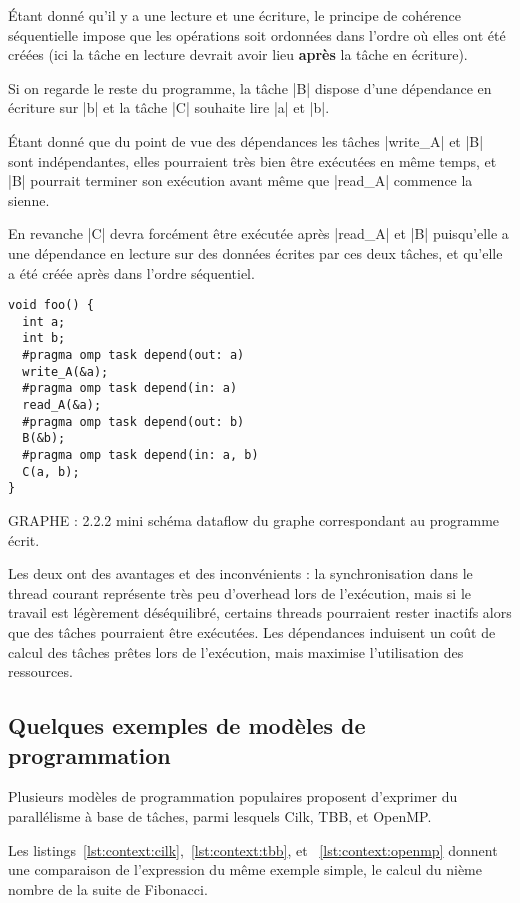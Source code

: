 Étant donné qu'il y a une lecture et une écriture, le principe de cohérence séquentielle impose que les opérations soit ordonnées dans l'ordre où elles ont été créées (ici la tâche en lecture devrait avoir lieu \textbf{après} la tâche en écriture).

Si on regarde le reste du programme, la tâche |B| dispose d'une dépendance en écriture sur |b| et la tâche |C| souhaite lire |a| et |b|.

Étant donné que du point de vue des dépendances les tâches |write_A| et |B| sont indépendantes, elles pourraient très bien être exécutées en même temps, et |B| pourrait terminer son exécution avant même que |read_A| commence la sienne.

En revanche |C| devra forcément être exécutée après |read_A| et |B| puisqu'elle a une dépendance en lecture sur des données écrites par ces deux tâches, et qu'elle a été créée après dans l'ordre séquentiel.


\begin{lstlisting}[caption=Synchronisation via des dépendances (OpenMP),label=lst:context:task-dep]
void foo() {
  int a;
  int b;
  #pragma omp task depend(out: a)
  write_A(&a);
  #pragma omp task depend(in: a)
  read_A(&a);
  #pragma omp task depend(out: b)
  B(&b);
  #pragma omp task depend(in: a, b)
  C(a, b);
}
\end{lstlisting}

\begin{todo}
GRAPHE : 2.2.2 mini schéma dataflow du graphe correspondant au programme écrit.
\end{todo}

Les deux ont des avantages et des inconvénients : la synchronisation dans le thread courant représente très peu d'overhead lors de l'exécution, mais si le travail est légèrement déséquilibré, certains threads pourraient rester inactifs alors que des tâches pourraient être exécutées.
Les dépendances induisent un coût de calcul des tâches prêtes lors de l'exécution, mais maximise l'utilisation des ressources.


\subsection{Quelques exemples de modèles de programmation}

Plusieurs modèles de programmation populaires proposent d'exprimer du parallélisme à base de tâches, parmi lesquels Cilk, TBB, et OpenMP.

Les listings~\ref{lst:context:cilk},~\ref{lst:context:tbb}, et ~\ref{lst:context:openmp} donnent une comparaison de l'expression du même exemple simple, le calcul du nième nombre de la suite de Fibonacci.

